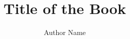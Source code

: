 \documentclass[14pt]{extbook}
\title{Title of the Book}
\author{Author Name}
\begin{document}
  \VerbatimFootnotes %
  
  
\end{document}
